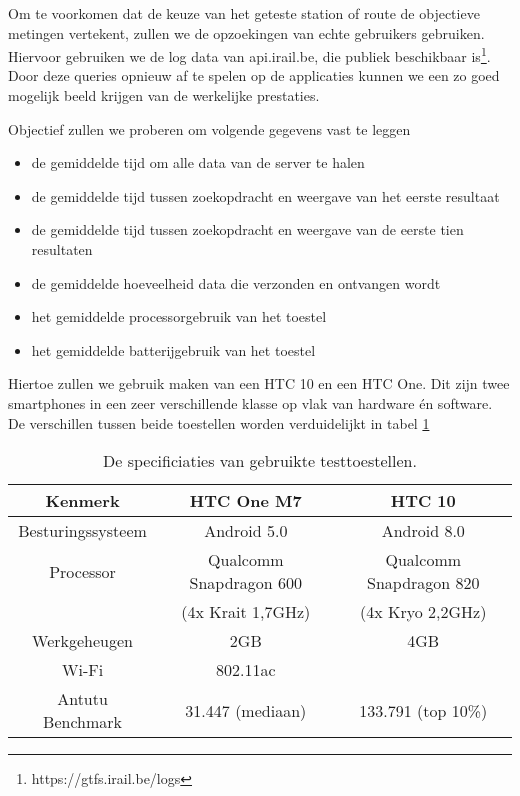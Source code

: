 Om te voorkomen dat de keuze van het geteste station of route de objectieve metingen vertekent, zullen we de opzoekingen van echte gebruikers gebruiken. Hiervoor gebruiken we de log data van api.irail.be, die publiek beschikbaar is\footnote{https://gtfs.irail.be/logs}. Door deze queries opnieuw af te spelen op de applicaties kunnen we een zo goed mogelijk beeld krijgen van de werkelijke prestaties.

Objectief zullen we proberen om volgende gegevens vast te leggen
\begin{itemize}
	\item de gemiddelde tijd om alle data van de server te halen
	\item de gemiddelde tijd tussen zoekopdracht en weergave van het eerste resultaat
	\item de gemiddelde tijd tussen zoekopdracht en weergave van de eerste tien resultaten
	\item de gemiddelde hoeveelheid data die verzonden en ontvangen wordt
	\item het gemiddelde processorgebruik van het toestel
	\item het gemiddelde batterijgebruik van het toestel
\end{itemize}

Hiertoe zullen we gebruik maken van een HTC 10 en een HTC One. Dit zijn twee smartphones in een zeer verschillende klasse op vlak van hardware én software. De verschillen tussen beide toestellen worden verduidelijkt in tabel \ref{tab:testdevices}
\begin{table}[ht]
	\begin{tabular}{| c | c | c |}
		\hline
		Kenmerk & HTC One M7 & HTC 10 \\
		\hline
		Besturingssysteem & Android 5.0 & Android 8.0 \\
		Processor & Qualcomm Snapdragon 600 & Qualcomm Snapdragon 820\\
		& (4x Krait 1,7GHz) & (4x Kryo 2,2GHz) \\
		Werkgeheugen & 2GB & 4GB\\
		Wi-Fi & 802.11ac &  \\
		\hline
		Antutu Benchmark & 31.447 (mediaan)  & 133.791 (top 10\%) \\
		\hline
	\end{tabular}
	\caption[Specificaties van de toestellen gebruikt voor testen]{De specificiaties van gebruikte testtoestellen.}
	\label{tab:testdevices}
\end{table}

